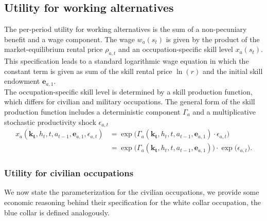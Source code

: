 \subsection{Utility for working alternatives}
The per-period utility for working alternatives is the sum of a non-pecuniary benefit and a wage component. The wage $w_{a}(s_t)$ is given by the product of the market-equilibrium rental price $\rho_{a,t}$ and an occupation-specific skill level $x_{a}(s_t)$. This specification leads to a standard logarithmic wage equation in which the constant term is given as sum of the skill rental price $\ln(r)$ and the initial skill endowment $\bm{e}_{a,1}$.\\

The occupation-specific skill level is determined by a skill production function, which differs for civilian and military occupations. The general form of the skill production function includes a deterministic component $\Gamma_a$ and a multiplicative stochastic productivity shock $\epsilon_{a,t}$
%
\begin{align}\label{eq:OccupationSpecificSkillLevel}
    x_{a}(\bm{k_t}, h_t, t, a_{t-1}, \bm{e}_{a, 1}, \epsilon_{a,t}) & = \exp \big( \Gamma_{a}(\bm{k_t},  h_t, t, a_{t-1}, \bm{e}_{a,1}) \cdot \epsilon_{a,t} \big) \nonumber \\
                & = \exp \big( \Gamma_a(\bm{k_t},  h_t, t, a_{t-1}, \bm{e}_{a,1}) \big) \cdot \exp \big( \epsilon_{a,t} \big).
\end{align}
\subsubsection{Utility for civilian occupations}
We now state the parameterization for the civilian occupations, we provide some economic reasoning behind their specification for the white collar occupation, the blue collar is defined analogously.


